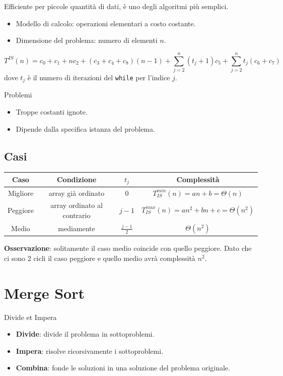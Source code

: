 \documentclass{article}
\begin{document}
Efficiente per piccole quantità di dati, è uno degli algoritmi più semplici.
\begin{itemize}
    \item Modello di calcolo: operazioni elementari a costo costante.
    \item Dimensione del problema: numero di elementi $n$.
\end{itemize}

\[
T^{IS}(n)= c_0+c_1+n c_2+(c_3+c_4+c_8)(n-1)
+\sum_{j=2}^n (t_j+1)c_5
+\sum_{j=2}^n t_j(c_6+c_7)
\]
dove $t_j$ è il numero di iterazioni del \texttt{while} per l'indice $j$.

\begin{warn}{Problemi}{}
\begin{itemize}
    \item Troppe costanti ignote.
    \item Dipende dalla specifica istanza del problema.
\end{itemize}
\end{warn}

\subsection{Casi}

\begin{center}
\setlength{\tabcolsep}{6pt}
\begin{tabular}{|c|c|c|c|}
\hline
\textbf{Caso} & \textbf{Condizione} & $t_j$ & \textbf{Complessità} \\
\hline
Migliore & array già ordinato & $0$ & $T_{IS}^{min}(n)=a n+b=\Theta(n)$ \\
\hline
Peggiore & array ordinato al contrario & $j-1$ & $T_{IS}^{max}(n)=a n^2+bn+c=\Theta(n^2)$ \\
\hline
Medio & mediamente & $\frac{j-1}{2}$ & $\Theta(n^2)$ \\
\hline
\end{tabular}
\end{center}

\textbf{Osservazione}: solitamente il caso medio coincide con quello peggiore.
Dato che ci sono 2 cicli il caso peggiore e quello medio avrà complessità $n^2$.

\section{Merge Sort}

\begin{info}{Divide et Impera}{}
\begin{itemize}
    \item \textbf{Divide}: divide il problema in sottoproblemi.
    \item \textbf{Impera}: risolve ricorsivamente i sottoproblemi.
    \item \textbf{Combina}: fonde le soluzioni in una soluzione del problema originale.
\end{itemize}
\end{info}
\end{document}
